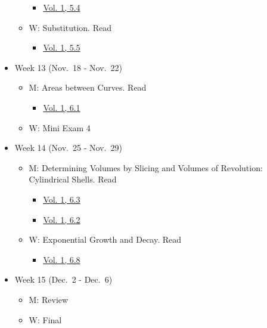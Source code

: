\documentclass[
]{article}
\providecommand{\tightlist}{%
  \setlength{\itemsep}{0pt}\setlength{\parskip}{0pt}}
\begin{document}
\begin{itemize}
\begin{itemize}
    \begin{itemize}
    \tightlist
    \item
      \href{https://openstax.org/books/calculus-volume-1/pages/5-4-integration-formulas-and-the-net-change-theorem}{Vol. 1, 5.4}
    \end{itemize}
  \item
    W: Substitution. Read

    \begin{itemize}
    \tightlist
    \item
      \href{https://openstax.org/books/calculus-volume-1/pages/5-5-substitution}{Vol. 1, 5.5}
    \end{itemize}
  \end{itemize}
\item
  Week 13 (Nov.~18 - Nov.~22)

  \begin{itemize}
  \tightlist
  \item
    M: Areas between Curves. Read

    \begin{itemize}
    \tightlist
    \item
      \href{https://openstax.org/books/calculus-volume-1/pages/6-1-areas-between-curves}{Vol. 1, 6.1}
    \end{itemize}
  \item
    W: Mini Exam 4
  \end{itemize}
\item
  Week 14 (Nov.~25 - Nov.~29)

  \begin{itemize}
  \tightlist
  \item
    M: Determining Volumes by Slicing and Volumes of Revolution: Cylindrical Shells. Read

    \begin{itemize}
    \tightlist
    \item
      \href{https://openstax.org/books/calculus-volume-1/pages/6-3-volumes-of-revolution-cylindrical-shells}{Vol. 1, 6.3}
    \item
      \href{https://openstax.org/books/calculus-volume-1/pages/6-2-determining-volumes-by-slicing}{Vol. 1, 6.2}
    \end{itemize}
  \item
    W: Exponential Growth and Decay. Read

    \begin{itemize}
    \tightlist
    \item
      \href{https://openstax.org/books/calculus-volume-1/pages/6-8-exponential-growth-and-decay}{Vol. 1, 6.8}
    \end{itemize}
  \end{itemize}
\item
  Week 15 (Dec.~2 - Dec.~6)

  \begin{itemize}
  \tightlist
  \item
    M: Review
  \item
    W: Final
  \end{itemize}
\end{itemize}
\end{document}
